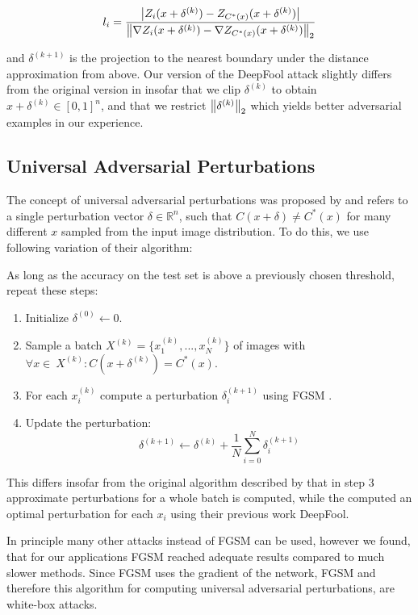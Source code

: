 \begin{equation}
l_i = 
\frac{
	\left \lvert Z_i(x + \delta^{(k)}) - Z_{C^*(x)}(x + \delta^{(k)}) \right \rvert
}
{
	\left \lVert \nabla Z_i(x + \delta^{(k)}) - \nabla Z_{C^*(x)}(x + \delta^{(k)}) \right \rVert _{2}
}
\end{equation}


and $\delta^{(k+1)}$ is the projection to the nearest boundary under the distance approximation from above.
Our version of the DeepFool attack slightly differs from the original version in insofar that we clip $\delta^{(k)}$ to obtain $x + \delta^{(k)} \in [0,1]^n$, and that we restrict $\left \lVert \delta^{(k)} \right \rVert _{2}$ which yields better adversarial examples in our experience.

\subsection{Universal Adversarial Perturbations}

The concept of universal adversarial perturbations was proposed by \citet{universal} and refers to a single perturbation vector $\delta \in \mathbb{R}^n$, such that $C(x + \delta) \neq C^*(x)$ for many different $x$ sampled from the input image distribution.
To do this, we use following variation of their algorithm:

As long as the accuracy on the test set is above a previously chosen threshold, repeat these steps:
\begin{enumerate}
	\item Initialize $\delta^{(0)} \gets 0$.
	\item Sample a batch $X^{(k)} = \{x_1^{(k)}, ..., x_N^{(k)}\}$ of images with $\forall x \in\ X^{(k)}:  C(x + \delta^{(k)}) = C^*(x)$.
	\item For each $x_i^{(k)}$ compute a perturbation $\delta_i^{(k+1)}$ using FGSM \citep{fgsm}.
	\item Update the perturbation: $$\delta^{(k+1)} \gets \delta^{(k)} + \frac{1}{N} \sum\limits_{i=0}^N \delta_i^{(k+1)}$$
\end{enumerate}

This differs insofar from the original algorithm described by \citet{universal} that in step 3 approximate perturbations for a whole batch is computed, while the computed an optimal perturbation for each $x_i$ using their previous work DeepFool.

In principle many other attacks instead of FGSM can be used, however we found, that for our applications FGSM reached adequate results compared to much slower methods.
Since FGSM uses the gradient of the network, FGSM and therefore this algorithm for computing universal adversarial perturbations, are white-box attacks.
